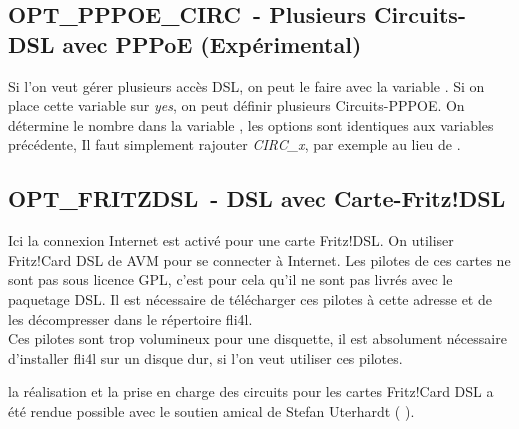 {
\subsection {OPT\_PPPOE\_CIRC~- Plusieurs Circuits-DSL avec PPPoE (Expérimental)}
}

Si l'on veut gérer plusieurs accès DSL, on peut le faire avec la variable
. Si on place cette variable sur \emph{yes},
on peut définir plusieurs Circuits-PPPOE. On détermine le nombre dans la
variable , les options sont identiques aux variables
 précédente, Il faut simplement rajouter \emph{CIRC\_x},
par exemple  au lieu de .

\subsection {OPT\_FRITZDSL~- DSL avec Carte-Fritz!DSL}

Ici la connexion Internet est activé pour une carte Fritz!DSL.
On utiliser Fritz!Card DSL de AVM pour se connecter à Internet. Les 
pilotes de ces cartes ne sont pas sous licence GPL, c'est pour cela qu'il
ne sont pas livrés avec le paquetage DSL. Il est nécessaire de télécharger
ces pilotes à cette adresse 
et de les décompresser dans le répertoire fli4l.\\ 
Ces pilotes sont trop volumineux pour une disquette, il est absolument
nécessaire d'installer fli4l sur un disque dur, si l'on veut utiliser
ces pilotes.

la réalisation et la prise en charge des circuits pour les cartes
Fritz!Card DSL a été rendue possible avec le soutien amical de
Stefan Uterhardt (  ).


